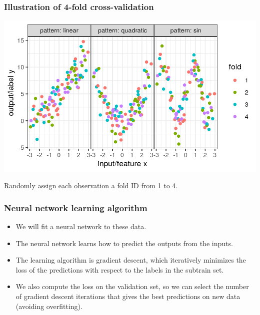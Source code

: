 \documentclass{beamer}
\begin{document}
\begin{frame}
  \frametitle{Illustration of 4-fold cross-validation}
  \includegraphics[width=\textwidth]{figure-overfitting-data-folds}

  Randomly assign each observation a fold ID from 1 to 4.
  
\end{frame}

\begin{frame}
  \frametitle{Neural network learning algorithm}
  \begin{itemize}
  \item We will fit a neural network to these data.
  \item The neural network learns how to predict the outputs from the inputs.
  \item The learning algorithm is gradient descent, which iteratively
    minimizes the loss of the predictions with respect to the labels
    in the subtrain set.
  \item We also compute the loss on the validation set, so we can
    select the number of gradient descent iterations that gives the
    best predictions on new data (avoiding overfitting).
  \end{itemize}
\end{frame}
 
\end{document}
